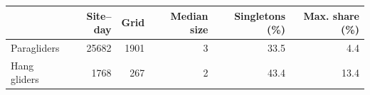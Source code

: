 \begin{tabular}{lrrrrr}
\toprule
 & Site--day & Grid & Median size & Singletons (\%) & Max. share (\%) \\
\midrule
Paragliders & 25682 & 1901 & 3 & 33.5 & 4.4 \\
Hang gliders & 1768 & 267 & 2 & 43.4 & 13.4 \\
\bottomrule
\end{tabular}
